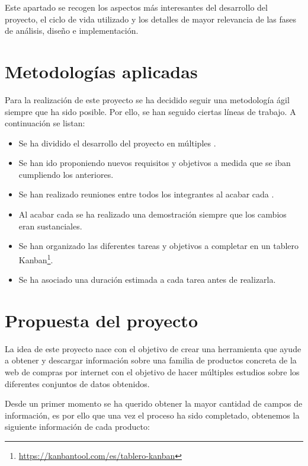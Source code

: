 
Este apartado se recogen los aspectos más interesantes del desarrollo del proyecto, el ciclo de vida utilizado y los detalles de mayor relevancia de las fases de análisis, diseño e implementación.

\section{Metodologías aplicadas}

Para la realización de este proyecto se ha decidido seguir una metodología ágil siempre que ha sido posible. Por ello, se han seguido ciertas líneas de trabajo. A continuación se listan:

\begin{itemize}
    \item Se ha dividido el desarrollo del proyecto en múltiples .
    \item Se han ido proponiendo nuevos requisitos y objetivos a medida que se iban cumpliendo los anteriores.
    \item Se han realizado reuniones entre todos los integrantes al acabar cada .
    \item Al acabar cada  se ha realizado una demostración siempre que los cambios eran sustanciales.
    \item Se han organizado las diferentes tareas y objetivos a completar en un tablero Kanban\footnote{\url{https://kanbantool.com/es/tablero-kanban}}.
    \item Se ha asociado una duración estimada a cada tarea antes de realizarla.
\end{itemize}

\section{Propuesta del proyecto}
La idea de este proyecto nace con el objetivo de crear una herramienta que ayude a obtener y descargar información sobre una familia de productos concreta de la web de compras por internet  con el objetivo de hacer múltiples estudios sobre los diferentes conjuntos de datos obtenidos.

Desde un primer momento se ha querido obtener la mayor cantidad de campos de información, es por ello que una vez el proceso ha sido completado, obtenemos la siguiente información de cada producto:

